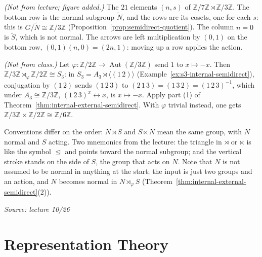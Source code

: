 \documentclass[11pt]{report}
\newcommand{\srcline}[1]{\par\hfill{\footnotesize\textit{Source: #1}}}
\begin{document}
\textit{(Not from lecture; figure added.)} The $21$ elements $(n, s)$ of $\mathbb{Z}/7\mathbb{Z} \rtimes \mathbb{Z}/3\mathbb{Z}$. The bottom row is the normal subgroup $\tilde N$, and the rows are its cosets, one for each $s$: this is $G/\tilde N \cong \mathbb{Z}/3\mathbb{Z}$ (Proposition~\ref{prop:semidirect-quotient}). The column $n = 0$ is $\tilde S$, which is not normal. The arrows are left multiplication by $(0, 1)$ on the bottom row, $(0, 1)(n, 0) = (2n, 1)$: moving up a row applies the action.

\begin{exbox}\label{ex:s3-external-semidirect}
\textit{(Not from class.)} Let $\varphi: \mathbb{Z}/2\mathbb{Z} \to \operatorname{Aut}(\mathbb{Z}/3\mathbb{Z})$ send $1$ to $x \mapsto -x$. Then $\mathbb{Z}/3\mathbb{Z} \rtimes_\varphi \mathbb{Z}/2\mathbb{Z} \cong S_3$: in $S_3 = A_3 \rtimes \langle (1\,2) \rangle$ (Example~\ref{ex:s3-internal-semidirect}), conjugation by $(1\,2)$ sends $(1\,2\,3)$ to $(2\,1\,3) = (1\,3\,2) = (1\,2\,3)^{-1}$, which under $A_3 \cong \mathbb{Z}/3\mathbb{Z}$, $(1\,2\,3)^x \leftrightarrow x$, is $x \mapsto -x$. Apply part (1) of Theorem~\ref{thm:internal-external-semidirect}. With $\varphi$ trivial instead, one gets $\mathbb{Z}/3\mathbb{Z} \times \mathbb{Z}/2\mathbb{Z} \cong \mathbb{Z}/6\mathbb{Z}$.
\end{exbox}

\begin{rembox}\label{rem:semidirect-notation}
Conventions differ on the order: $N \rtimes S$ and $S \ltimes N$ mean the same group, with $N$ normal and $S$ acting. Two mnemonics from the lecture: the triangle in $\rtimes$ or $\ltimes$ is like the symbol $\trianglelefteq$ and points toward the normal subgroup; and the vertical stroke stands on the side of $S$, the group that acts on $N$. Note that $N$ is not assumed to be normal in anything at the start; the input is just two groups and an action, and $N$ becomes normal in $N \rtimes_\varphi S$ (Theorem~\ref{thm:internal-external-semidirect}(2)).
\srcline{lecture 10/26}
\end{rembox}


\part{Representation Theory}
\end{document}
